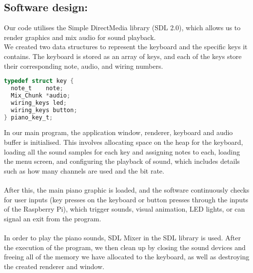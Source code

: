 \documentclass[11pt]{article}
\begin{document}
\subsection{Software design:}
Our code utilises the Simple DirectMedia library (SDL 2.0), which allows us to render graphics and mix audio for sound playback.
\\

We created two data structures to represent the keyboard and the specific keys it contains. The keyboard is stored as an array of keys, and each of the keys store their corresponding note, audio, and wiring numbers.

\begin{lstlisting}[language=C, caption={Pi-ano key structure}]
typedef struct key {
  note_t    note;
  Mix_Chunk *audio;
  wiring_keys led;
  wiring_keys button;
} piano_key_t;
\end{lstlisting} 

In our main program, the application window, renderer, keyboard and audio buffer is initialised. This involves allocating space on the heap for the keyboard, loading all the sound samples for each key and assigning notes to each, loading the menu screen, and configuring the playback of sound, which includes details such as how many channels are used and the bit rate.
\\
\\
After this, the main piano graphic is loaded, and the software continuously checks for user inputs (key presses on the keyboard or button presses through the inputs of the Raspberry Pi), which trigger sounds, visual animation, LED lights, or can signal an exit from the program.
\\
\\
In order to play the piano sounds, SDL Mixer in the SDL library is used. After the execution of the program, we then clean up by closing the sound devices and freeing all of the memory we have allocated to the keyboard, as well as destroying the created renderer and window.
\end{document}
